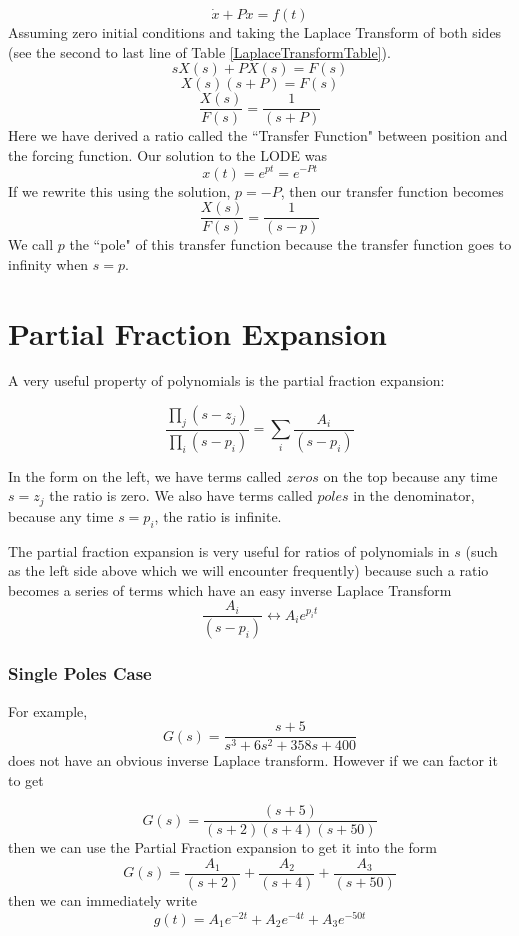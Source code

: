 \[
\dot{x} + Px = f(t)
\]
Assuming zero initial conditions and taking the Laplace Transform of both sides (see the second to last line of Table \ref{LaplaceTransformTable}).
\[
sX(s) + PX(s) = F(s)
\]
\[
X(s) (s+P) = F(s)
\]
\[
\frac{X(s)}{F(s)} = \frac {1}  {(s+P)}
\]
Here we have derived a ratio called the ``Transfer Function" between position and the forcing function.  Our solution to the LODE was
\[
x(t) =  e^{pt} =  e^{-Pt}
\]
If we rewrite this using the solution, $p = -P$, then our transfer function becomes
\[
\frac{X(s)}{F(s)} = \frac {1}  {(s-p)}
\]
We call $p$ the ``pole" of this transfer function because the transfer function goes to infinity when $s=p$.



\section{Partial Fraction Expansion}\label{partialfractionsection}

A very useful property of polynomials is the partial fraction expansion:

\[
\frac{\prod_j (s-z_j)}{\prod_i (s-p_i)}    =  \sum_i  \frac{A_i}{(s-p_i)}
\]

In the form on the left, we have terms called $zeros$ on the top because any time $s=z_j$ the ratio is zero.  We also have terms called $poles$ in the denominator, because any time $s=p_i$, the ratio is infinite.

The partial fraction expansion is very useful for ratios of polynomials in $s$
(such as the left side above which we will encounter frequently) because such a ratio
becomes a series of terms which have an easy inverse Laplace Transform
\[
\frac{A_i}{(s-p_i)}   \leftrightarrow  A_ie^{p_it}
\]



\subsubsection{Single Poles Case}
For example,
\[
G(s) = \frac{s+5}{s^3 + 6s^2+ 358s+400}
\]
does not have an obvious inverse Laplace transform.   However if we can factor it to get

\[
G(s) = \frac  {(s+5)}   {(s+2)(s+4)(s+50)}
\]
then we can use the Partial Fraction expansion to  get it into the form
\[
G(s) = \frac{A_1}{(s+2)}+\frac{A_2}{(s+4)}+\frac{A_3}{(s+50)}
\]
then we can immediately write
\[
g(t) = A_1e^{-2t} + A_2e^{-4t} + A_3e^{-50t}
\]





